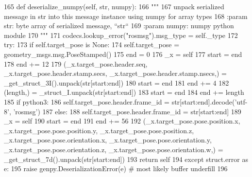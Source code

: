 \begin{DoxyCode}
165   \textcolor{keyword}{def }deserialize\_numpy(self, str, numpy):
166     \textcolor{stringliteral}{"""}
167 \textcolor{stringliteral}{    unpack serialized message in str into this message instance using numpy for array types}
168 \textcolor{stringliteral}{    :param str: byte array of serialized message, ``str``}
169 \textcolor{stringliteral}{    :param numpy: numpy python module}
170 \textcolor{stringliteral}{    """}
171     codecs.lookup\_error(\textcolor{stringliteral}{"rosmsg"}).msg\_type = self.\_type
172     \textcolor{keywordflow}{try}:
173       \textcolor{keywordflow}{if} self.target\_pose \textcolor{keywordflow}{is} \textcolor{keywordtype}{None}:
174         self.target\_pose = geometry\_msgs.msg.PoseStamped()
175       end = 0
176       \_x = self
177       start = end
178       end += 12
179       (\_x.target\_pose.header.seq, \_x.target\_pose.header.stamp.secs, \_x.target\_pose.header.stamp.nsecs,) = 
      \_get\_struct\_3I().unpack(str[start:end])
180       start = end
181       end += 4
182       (length,) = \_struct\_I.unpack(str[start:end])
183       start = end
184       end += length
185       \textcolor{keywordflow}{if} python3:
186         self.target\_pose.header.frame\_id = str[start:end].decode(\textcolor{stringliteral}{'utf-8'}, \textcolor{stringliteral}{'rosmsg'})
187       \textcolor{keywordflow}{else}:
188         self.target\_pose.header.frame\_id = str[start:end]
189       \_x = self
190       start = end
191       end += 56
192       (\_x.target\_pose.pose.position.x, \_x.target\_pose.pose.position.y, \_x.target\_pose.pose.position.z, 
      \_x.target\_pose.pose.orientation.x, \_x.target\_pose.pose.orientation.y, \_x.target\_pose.pose.orientation.z, 
      \_x.target\_pose.pose.orientation.w,) = \_get\_struct\_7d().unpack(str[start:end])
193       \textcolor{keywordflow}{return} self
194     \textcolor{keywordflow}{except} struct.error \textcolor{keyword}{as} e:
195       \textcolor{keywordflow}{raise} genpy.DeserializationError(e)  \textcolor{comment}{# most likely buffer underfill}
196 
\end{DoxyCode}
\mbox{\label{classmotion__plan_1_1msg_1_1__PlanningGoal_1_1PlanningGoal_ab521b5fd374696fd89c2de67862d2906}} 
